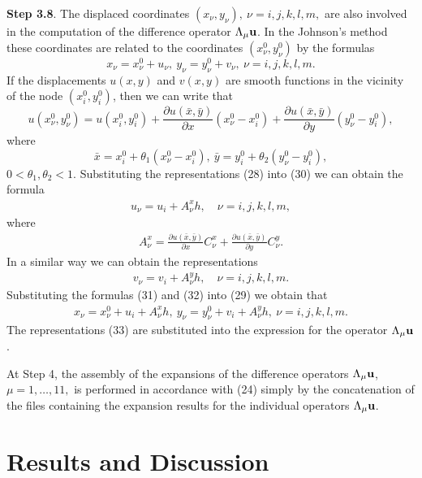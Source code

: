  {\bf Step 3.8}. The displaced coordinates $(x_\nu,y_\nu),~\nu=i,j,k,l,m,$ are
also involved in
the computation of the difference operator $\Lambda_\mu{\bf u}$.
In the Johnson's method these coordinates are related to the coordinates
$(x_\nu^0,y_\nu^0)$ by the formulas
\begin{equation}
x_\nu=x_\nu^0+u_\nu,~y_\nu=y_\nu^0+v_\nu,~\nu=i,j,k,l,m.
\end{equation}
If the displacements $u(x,y)$ and $v(x,y)$ are smooth functions in the vicinity
of the node $(x_i^0,y_i^0)$, then we can write that
\begin{equation}
u(x_\nu^0,y_\nu^0)=u(x_i^0,y_i^0) + \frac{\partial u(\bar{x},\bar{y})}{
\partial x}(x_\nu^0-x_i^0) + \frac{\partial u(\bar{x},\bar{y})}{\partial y}
(y_\nu^0-y_i^0),
\end{equation}
where
$$\bar{x}=x_i^0+\theta_1(x_\nu^0-x_i^0),~\bar{y}=y_i^0+\theta_2(y_\nu^0-y_i^0),$$
$0<\theta_1,\theta_2<1$. Substituting the representations (28) into (30) we can
obtain the formula
\begin{eqnarray}
u_\nu=u_i+A_\nu^x h,\quad \nu=i,j,k,l,m,
\end{eqnarray}
where
\begin{eqnarray*}
A_\nu^x=\frac{\partial u(\bar{x},\bar{y})}{
\partial x}C_\nu^x + \frac{\partial u(\bar{x},\bar{y})}{\partial y}C_\nu^y.
\end{eqnarray*}
In a similar way we can obtain the representations
\begin{eqnarray}
v_\nu=v_i+A_\nu^y h,\quad \nu=i,j,k,l,m.
\end{eqnarray}
Substituting the formulas (31) and (32) into (29) we obtain that
\begin{eqnarray}
x_\nu=x_\nu^0+u_i+A_\nu^x h,~y_\nu=y_\nu^0+v_i+A_\nu^y h,~ \nu=i,j,k,l,m.
\end{eqnarray}
The representations (33) are substituted into the expression for the operator
$\Lambda_\mu{\bf u}$.

   At Step 4, the assembly of the expansions of the difference operators
$\Lambda_\mu{\bf u}$, $\mu=1,\ldots,11,$ is performed in accordance with (24)
simply by the concatenation of the files containing the expansion results for
the individual operators $\Lambda_\mu{\bf u}$.

\section{Results and Discussion}
\hspace{6mm}

